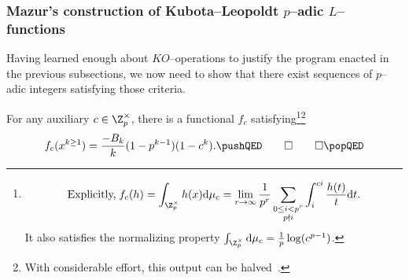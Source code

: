 \subsubsection{Mazur's construction of Kubota--Leopoldt \(p\)--adic \(L\)--functions}

Having learned enough about \(KO\)--operations to justify the program enacted in the previous subsections, we now need to show that there exist sequences of \(p\)--adic integers satisfying those criteria.

\begin{theorem}
For any auxiliary \(c \in \Z_p^\times\), there is a functional \(f_c\) satisfying\footnote{\[\text{Explicitly,\;} f_c(h) = \int_{\Z_p^\times} h(x) \mathrm d\mu_c = \lim_{r \to \infty} \frac{1}{p^r} \sum_{\substack{0 \le i < p^r \\ p \nmid i}} \int_i^{ci} \frac{h(t)}{t} \mathrm dt.\]  It also satisfies the normalizing property \(\int_{\Z_p^\times} \mathrm d\mu_c = \frac{1}{p} \log(c^{p-1})\).}\footnote{With considerable effort, this output can be halved~\cite[Section 10.3]{AHR}.} \[f_c(x^{k \ge 1}) = \frac{-B_k}{k}(1 - p^{k-1})(1 - c^k).  \pushQED\qed \qedhere \popQED\]
\end{theorem}

